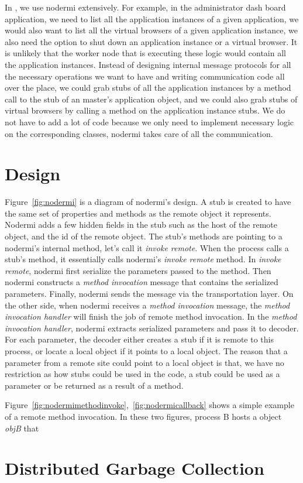 In \projectname{}, we use nodermi extensively. 
For example, in the administrator dash board application, 
we need to list all the application instances of a given application,
we would also want to list all the virtual browsers of a given application instance,
we also need the option to shut down an application instance or a virtual browser.
It is unlikely that the worker node that is executing these logic would contain
all the application instances.
Instead of designing internal message protocols for all the necessary
operations we want to have and writing communication code all over 
the place, 
we could grab stubs of all the application instances by a method call
to the stub of an master's application object, 
and we could also grab stubs of virtual browsers by calling a method 
on the application instance stubs.
We do not have to add a lot of code because we only need to 
implement necessary logic on the corresponding classes,
nodermi takes care of all the communication.

\nodermifig{}

\section{Design}
Figure~\ref{fig:nodermi} is a diagram of nodermi's design.
A stub is created to have the same set of properties and methods as the remote object
it represents.
Nodermi adds a few hidden fields in the stub such as the host of the remote object,
and the id of the remote object.
The stub's methods are pointing to a nodermi's internal method,
let's call it \emph{invoke remote}.
When the process calls a stub's method, 
it essentially calls nodermi's \emph{invoke remote} method. 
In \emph{invoke remote}, nodermi first serialize the parameters passed
to the method.
Then nodermi constructs a \emph{method invocation} message that contains
the serialized parameters.
Finally, nodermi sends the message via the transportation layer.
On the other side, when nodermi receives a \emph{method invocation} message,
the \emph{method invocation handler} will finish the job of remote method invocation.
In the \emph{method invocation handler},
nodermi extracts serialized parameters and pass it to decoder.
For each parameter,
the decoder either creates a stub if it is remote to this process,
or locate a local object if it points to a local object.
The reason that a parameter from a remote site could point to a local object is that,
we have no restriction as how stubs could be used in the code, 
a stub could be used as a parameter or be returned as a result of a method.

\nodrmimethodinvokefig{}
\nodrmicallbackfig{}

Figure~\ref{fig:nodermimethodinvoke},~\ref{fig:nodermicallback} shows a simple example
of a remote method invocation. 
In these two figures, process B hosts a object \emph{objB} that 


\section{Distributed Garbage Collection}